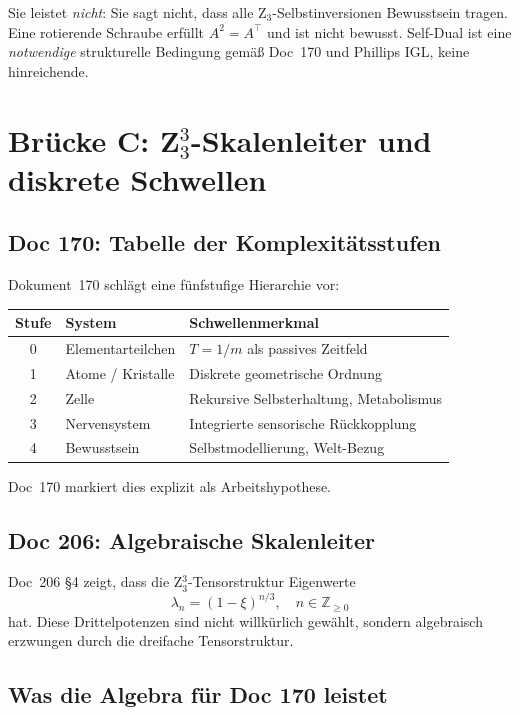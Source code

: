 Sie leistet \emph{nicht}: Sie sagt nicht, dass alle Z$_3$-Selbstinversionen Bewusstsein tragen. Eine rotierende Schraube erfüllt $A^2 = A^\top$ und ist nicht bewusst. Self-Dual ist eine \emph{notwendige} strukturelle Bedingung gemäß Doc~170 und Phillips IGL, keine hinreichende.

\section{\texorpdfstring{Brücke C: Z$_3^3$-Skalenleiter und diskrete Schwellen}{Brücke C: Z3-hoch-3-Skalenleiter und diskrete Schwellen}}\label{sec:brueckeC}

\subsection{Doc 170: Tabelle der Komplexitätsstufen}

Dokument~170 schlägt eine fünfstufige Hierarchie vor:

\begin{center}
\begin{tabular}{c|l|l}
\textbf{Stufe} & \textbf{System} & \textbf{Schwellenmerkmal} \\
\hline
0 & Elementarteilchen & $T = 1/m$ als passives Zeitfeld \\
1 & Atome / Kristalle & Diskrete geometrische Ordnung \\
2 & Zelle & Rekursive Selbsterhaltung, Metabolismus \\
3 & Nervensystem & Integrierte sensorische Rückkopplung \\
4 & Bewusstsein & Selbstmodellierung, Welt-Bezug \\
\end{tabular}
\end{center}

Doc~170 markiert dies explizit als Arbeitshypothese.

\subsection{Doc 206: Algebraische Skalenleiter}

Doc~206 \S4 zeigt, dass die Z$_3^3$-Tensorstruktur Eigenwerte
\[
\lambda_n = (1-\xi)^{n/3}, \quad n \in \mathbb{Z}_{\geq 0}
\]
hat. Diese Drittelpotenzen sind nicht willkürlich gewählt, sondern algebraisch erzwungen durch die dreifache Tensorstruktur.

\subsection{Was die Algebra für Doc 170 leistet}

